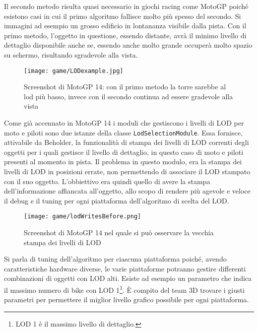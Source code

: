 Il secondo metodo risulta quasi necessario in giochi racing come MotoGP poiché esistono casi in cui il primo algoritmo fallisce molto più spesso del secondo. Si immagini ad esempio un grosso edificio in lontananza visibile dalla pista. Con il primo metodo, l'oggetto in questione, essendo distante, avrà il minimo livello di dettaglio disponibile anche se, essendo anche molto grande occuperà molto spazio su schermo, risultando sgradevole alla vista.\\

\begin{figure}[h!] 
	\centering 
	\hspace*{-0.05\columnwidth}\texttt{[image: game/LODexample.jpg]} 
	\caption{Screenshot di MotoGP 14: con il primo metodo la torre sarebbe al lod più basso, invece con il secondo continua ad essere gradevole alla vista}
\end{figure} 

Come già accennato in MotoGP 14 i moduli che gestiscono i livelli di LOD per moto e piloti sono due istanze della classe \texttt{LodSelectionModule}. Essa fornisce, attivabile da Beholder, la funzionalità di stampa dei livelli di LOD correnti degli oggetti per i quali gestisce il livello di dettaglio, in questo caso di moto e piloti presenti al momento in pista. Il problema in questo modulo, era la stampa dei livelli di LOD in posizioni errate, non permettendo di associare il LOD stampato con il suo oggetto. L'obbiettivo era quindi quello di avere la stampa dell'informazione affiancata all'oggetto, allo scopo di rendere più agevole e veloce il debug e il tuning per ogni piattaforma dell'algoritmo di scelta del LOD.\\

\begin{figure}[h!] 
	\centering 
	\hspace*{-0.05\columnwidth}\texttt{[image: game/lodWritesBefore.png]} 
	\caption{Screenshot di MotoGP 14 nel quale si può osservare la vecchia stampa dei livelli di LOD}
\end{figure}

Si parla di tuning dell'algoritmo per ciascuna piattaforma poiché, avendo caratteristiche hardware diverse, le varie piattaforme potranno gestire differenti combinazioni di oggetti con LOD alti. Esiste ad esempio un parametro che indica il massimo numero di bike con LOD 1\footnote{LOD 1 è il massimo livello di dettaglio.}. È compito del team 3D trovare i giusti parametri per permettere il miglior livello grafico possibile per ogni piattaforma.\\ 

